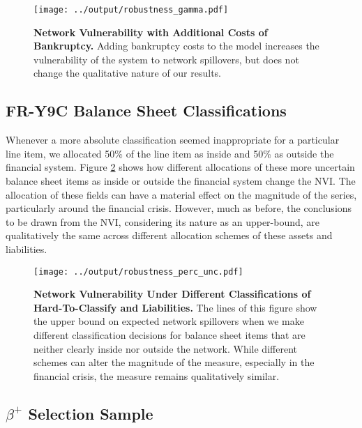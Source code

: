 \begin{figure}[h!]
\begin{center}
\texttt{[image: ../output/robustness\_gamma.pdf]}
\end{center}
\caption[]{\textbf{Network Vulnerability with Additional Costs of Bankruptcy.} Adding bankruptcy costs to the model increases the vulnerability of the system to network spillovers, but does not change the qualitative nature of our results.} \label{fig:robustness_gamma}
\end{figure}

\subsection{FR-Y9C Balance Sheet Classifications}

Whenever a more absolute classification seemed inappropriate for a particular line item, we allocated 50\% of the line item as inside and 50\% as outside the financial system. Figure \ref{fig:robustness_allocations} shows how different allocations of these more uncertain balance sheet items as inside or outside the financial system change the NVI. The allocation of these fields can have a material effect on the magnitude of the series, particularly around the financial crisis. However, much as before, the conclusions to be drawn from the NVI, considering its nature as an upper-bound, are qualitatively the same across different allocation schemes of these assets and liabilities.  

\begin{figure}[h!]
\begin{center}
\texttt{[image: ../output/robustness\_perc\_unc.pdf]}
\end{center}
\caption[]{\textbf{Network Vulnerability Under Different Classifications of Hard-To-Classify and Liabilities.} The lines of this figure show the upper bound on expected network spillovers when we make different classification decisions for balance sheet items that are neither clearly inside nor outside the network. While different schemes can alter the magnitude of the measure, especially in the financial crisis, the measure remains qualitatively similar.} \label{fig:robustness_allocations}
\end{figure}

\subsection{$\beta^+$ Selection Sample}

